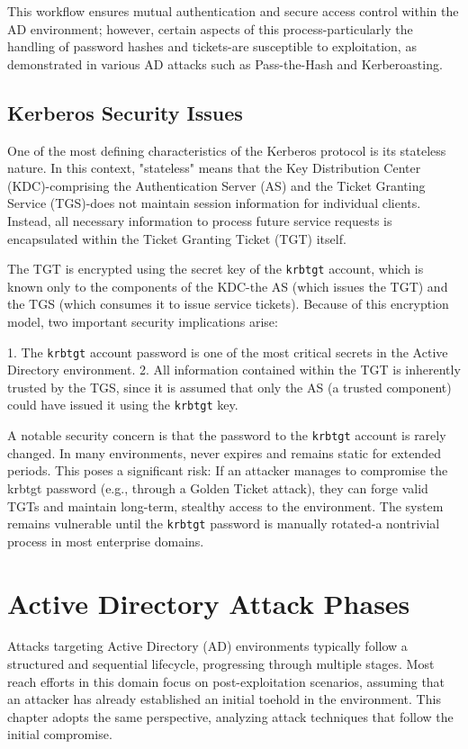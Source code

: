 {This workflow ensures mutual authentication and secure access control within the AD environment; however, certain aspects of this process-particularly the handling of password hashes and tickets-are susceptible to exploitation, as demonstrated in various AD attacks such as Pass-the-Hash and Kerberoasting.

\subsection{Kerberos Security Issues}
One of the most defining characteristics of the Kerberos protocol is its stateless nature. In this context, "stateless" means that the Key Distribution Center (KDC)-comprising the Authentication Server (AS) and the Ticket Granting Service (TGS)-does not maintain session information for individual clients. Instead, all necessary information to process future service requests is encapsulated within the Ticket Granting Ticket (TGT) itself.

The TGT is encrypted using the secret key of the \texttt{krbtgt} account, which is known only to the components of the KDC-the AS (which issues the TGT) and the TGS (which consumes it to issue service tickets). Because of this encryption model, two important security implications arise:

1. The \texttt{krbtgt} account password is one of the most critical secrets in the Active Directory environment.
2. All information contained within the TGT is inherently trusted by the TGS, since it is assumed that only the AS (a trusted component) could have issued it using the \texttt{krbtgt} key.

A notable security concern is that the password to the \texttt{krbtgt} account is rarely changed. In many environments, never expires and remains static for extended periods. This poses a significant risk: If an attacker manages to compromise the krbtgt password (e.g., through a Golden Ticket attack), they can forge valid TGTs and maintain long-term, stealthy access to the environment. The system remains vulnerable until the \texttt{krbtgt} password is manually rotated-a nontrivial process in most enterprise domains.

\section{Active Directory Attack Phases}
Attacks targeting Active Directory (AD) environments typically follow a structured and sequential lifecycle, progressing through multiple stages. Most reach efforts in this domain focus on post-exploitation scenarios, assuming that an attacker has already established an initial toehold in the environment. This chapter adopts the same perspective, analyzing attack techniques that follow the initial compromise.

}
